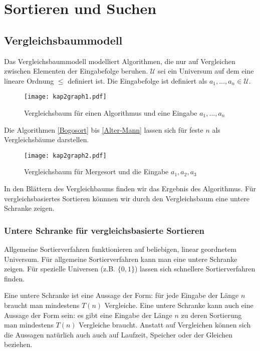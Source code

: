 \chapter{Sortieren und Suchen}
\section{Vergleichsbaummodell}
Das Vergleichsbaummodell modelliert Algorithmen, die nur auf Vergleichen zwischen Elementen der Eingabefolge beruhen. $\mathcal{U}$ sei ein Universum auf dem eine lineare Ordnung $\le$ definiert ist. Die Eingabefolge ist definiert als $a_1, \ldots, a_n \in \mathcal{U}$.

\begin{figure}[htb]
  \centering
  \texttt{[image: kap2graph1.pdf]}
  \caption{Vergleichsbaum für einen Algorithmus und eine Eingabe $a_1, \ldots, a_n$}
\end{figure}

Die Algorithmen \ref{Bogosort} bis \ref{Alter-Mann} lassen sich für feste $n$ als Vergleichsbäume darstellen.

\begin{figure}[htb]
  \centering
  \texttt{[image: kap2graph2.pdf]}
  \caption{Vergleichsbaum für Mergesort und die Eingabe $a_1, a_2, a_3$}
\end{figure}

In den Blättern des Vergleichbaums finden wir das Ergebnis des Algorithmus. Für vergleichsbasiertes Sortieren könnnen wir durch den Vergleichsbaum eine untere Schranke zeigen.

\subsection{Untere Schranke für vergleichsbasierte Sortieren}
Allgemeine Sortierverfahren funktionieren auf beliebigen, linear geordnetem Universum. Für allgemeine Sortierverfahren kann man eine untere Schranke zeigen. Für spezielle Universen (z.B. $\lbrace 0, 1 \rbrace$) lassen sich schnellere Sortierverfahren finden.

Eine untere Schranke ist eine Aussage der Form: für jede Eingabe der Länge $n$ braucht man mindestens $T(n)$ Vergleiche. Eine untere Schranke kann auch eine Aussage der Form sein: es gibt eine Eingabe der Länge $n$ zu deren Sortierung man mindestens $T(n)$ Vergleiche braucht. Anstatt auf Vergleichen können sich die Aussagen natürlich auch auch auf Laufzeit, Speicher oder der Gleichen beziehen.

